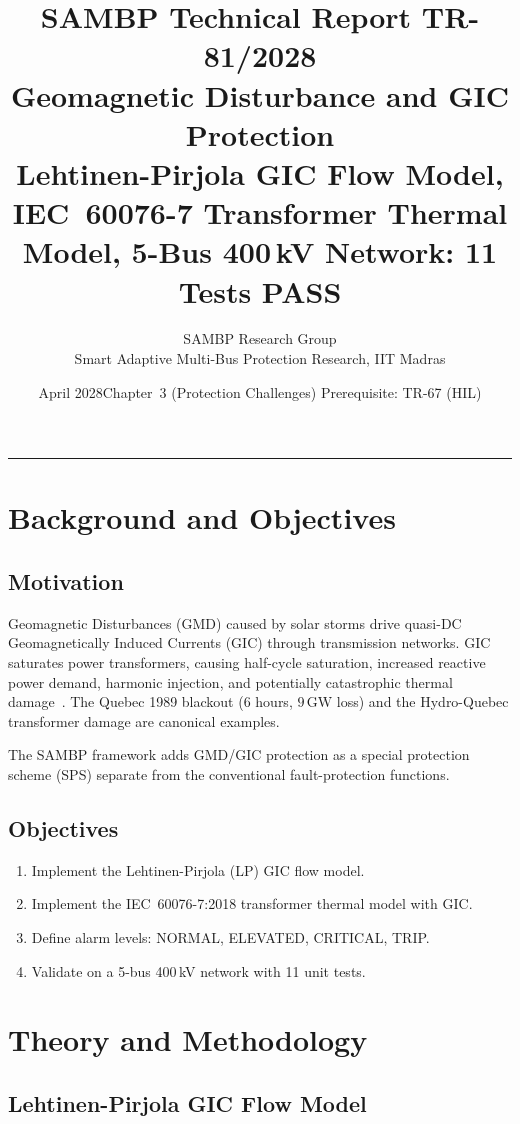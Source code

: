 \documentclass[11pt, a4paper]{article}
\title{\textbf{\textsf{\color{sambpblue}SAMBP Technical Report TR-81/2028}}\\[6pt]
  \Large Geomagnetic Disturbance and GIC Protection\\[4pt]
  \normalsize Lehtinen-Pirjola GIC Flow Model, IEC~60076-7 Transformer
  Thermal Model, 5-Bus 400\,kV Network: 11 Tests PASS}
\author{SAMBP Research Group\\[2pt]
  \small Smart Adaptive Multi-Bus Protection Research, IIT Madras}
\date{April 2028\quad\textbar\quad Chapter~3 (Protection Challenges)\quad\textbar\quad
  Prerequisite: TR-67 (HIL)}
\begin{document}
\maketitle
\tableofcontents
\vspace{6pt}\hrule\vspace{10pt}

\section{Background and Objectives}
\label{sec:background}

\subsection{Motivation}

Geomagnetic Disturbances (GMD) caused by solar storms drive quasi-DC
Geomagnetically Induced Currents (GIC) through transmission networks.
GIC saturates power transformers, causing half-cycle saturation, increased
reactive power demand, harmonic injection, and potentially catastrophic
thermal damage~\cite{Gaunt2007}. The Quebec 1989 blackout (6 hours, $9\,\text{GW}$
loss) and the Hydro-Quebec transformer damage are canonical examples.

The SAMBP framework adds GMD/GIC protection as a special protection scheme
(SPS) separate from the conventional fault-protection functions.

\subsection{Objectives}

\begin{enumerate}
  \item Implement the Lehtinen-Pirjola (LP) GIC flow model.
  \item Implement the IEC~60076-7:2018 transformer thermal model with GIC.
  \item Define alarm levels: NORMAL, ELEVATED, CRITICAL, TRIP.
  \item Validate on a 5-bus 400\,kV network with 11 unit tests.
\end{enumerate}

\section{Theory and Methodology}
\label{sec:theory}

\subsection{Lehtinen-Pirjola GIC Flow Model}
\end{document}

